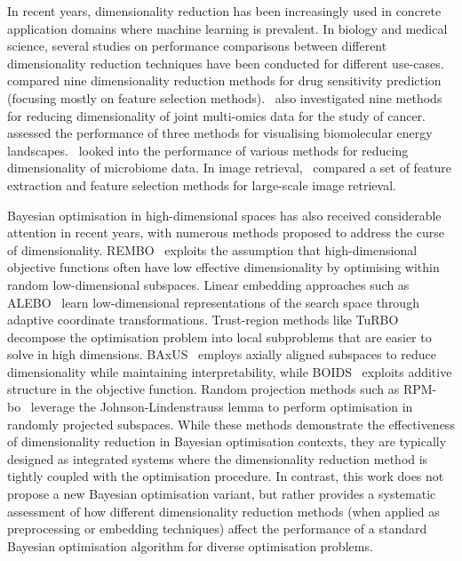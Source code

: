 In recent years, dimensionality reduction has been increasingly used in concrete application domains where machine learning is prevalent.
In biology and medical science, several studies on performance comparisons between different dimensionality reduction techniques have been conducted for different use-cases.~\citet{EckEtAl24} compared nine dimensionality reduction methods for drug sensitivity prediction (focusing mostly on feature selection methods).~\citet{CanEtAl21} also investigated nine methods for reducing dimensionality of joint multi-omics data for the study of cancer.~\citet{BhaCha25} assessed the performance of three methods for visualising biomolecular energy landscapes.~\citet{ArmEtAl22} looked into the performance of various methods for reducing dimensionality of microbiome data.
In image retrieval,~\citet{ZhuEtAl14} compared a set of feature extraction and feature selection methods for large-scale image retrieval.


Bayesian optimisation in high-dimensional spaces has also received considerable attention in recent years, with numerous methods proposed to address the curse of dimensionality. 
REMBO~\citep{WanEtAl16b} exploits the assumption that high-dimensional objective functions often have low effective dimensionality by optimising within random low-dimensional subspaces.
Linear embedding approaches such as ALEBO~\citep{LetEtAl20} learn low-dimensional representations of the search space through adaptive coordinate transformations. 
Trust-region methods like TuRBO~\citep{EriEtAl19b} decompose the optimisation problem into local subproblems that are easier to solve in high dimensions.
BAxUS~\citep{PapEtAl22} employs axially aligned subspaces to reduce dimensionality while maintaining interpretability, while BOIDS~\citep{NgoEtAl25} exploits additive structure in the objective function. 
Random projection methods such as RPM-\gls{bo}~\citep{NguTra24} leverage the Johnson-Lindenstrauss lemma to perform optimisation in randomly projected subspaces. 
While these methods demonstrate the effectiveness of dimensionality reduction in Bayesian optimisation contexts, they are typically designed as integrated systems where the dimensionality reduction method is tightly coupled with the optimisation procedure. 
In contrast, this work does not propose a new Bayesian optimisation variant, but rather provides a systematic assessment of how different dimensionality reduction methods (when applied as preprocessing or embedding techniques) affect the performance of a standard Bayesian optimisation algorithm for diverse optimisation problems.


